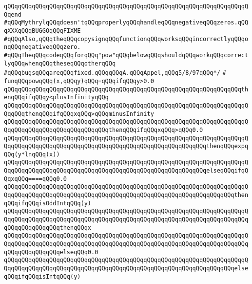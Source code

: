 \verb|qQQqqQQqqQQqqQQqqQQqqQQqqQQqqQQqqQQqqQQqqQQqqQQqqQQqqQQqqQQqqQQqqQQqqQQqend|\newline
\newline
\verb|#qQQqMythrylqQQqdoesn'tqQQqproperlyqQQqhandleqQQqnegativeqQQqzeros.qQQqXXXqQQqBUGGOqQQqFIXME|\newline
\verb|#qQQqAlso,qQQqtheqQQqcopysignqQQqfunctionqQQqworksqQQqincorrectlyqQQqonqQQqnegativeqQQqzero.|\newline
\verb|#qQQqTheqQQqcodeqQQqforqQQq"pow"qQQqbelowqQQqshouldqQQqworkqQQqcorrectlyqQQqwhenqQQqtheseqQQqotherqQQq|\newline
\verb|#qQQqbugsqQQqareqQQqfixed.qQQqqQQqA.qQQqAppel,qQQq5/8/97qQQq*/|\newline
\verb|#|\newline
\verb|funqQQqpowqQQq(x,qQQqy)qQQq=qQQqifqQQqy>0.0|\newline
\verb|qQQqqQQqqQQqqQQqqQQqqQQqqQQqqQQqqQQqqQQqqQQqqQQqqQQqqQQqqQQqqQQqqQQqthenqQQqifqQQqy<plusInfinityqQQq|\newline
\verb|qQQqqQQqqQQqqQQqqQQqqQQqqQQqqQQqqQQqqQQqqQQqqQQqqQQqqQQqqQQqqQQqqQQqqQQqqQQqthenqQQqifqQQqxqQQq>qQQqminusInfinity|\newline
\verb|qQQqqQQqqQQqqQQqqQQqqQQqqQQqqQQqqQQqqQQqqQQqqQQqqQQqqQQqqQQqqQQqqQQqqQQqqQQqqQQqqQQqqQQqqQQqqQQqqQQqthenqQQqifqQQqxqQQq>qQQq0.0|\newline
\verb|qQQqqQQqqQQqqQQqqQQqqQQqqQQqqQQqqQQqqQQqqQQqqQQqqQQqqQQqqQQqqQQqqQQqqQQqqQQqqQQqqQQqqQQqqQQqqQQqqQQqqQQqqQQqqQQqqQQqqQQqqQQqqQQqthenqQQqexpqQQq(y*lnqQQq(x))|\newline
\verb|qQQqqQQqqQQqqQQqqQQqqQQqqQQqqQQqqQQqqQQqqQQqqQQqqQQqqQQqqQQqqQQqqQQqqQQqqQQqqQQqqQQqqQQqqQQqqQQqqQQqqQQqqQQqqQQqqQQqqQQqqQQqqQQqelseqQQqifqQQqxqQQq====qQQq0.0|\newline
\verb|qQQqqQQqqQQqqQQqqQQqqQQqqQQqqQQqqQQqqQQqqQQqqQQqqQQqqQQqqQQqqQQqqQQqqQQqqQQqqQQqqQQqqQQqqQQqqQQqqQQqqQQqqQQqqQQqqQQqqQQqqQQqqQQqqQQqqQQqthenqQQqifqQQqisOddIntqQQq(y)|\newline
\verb|qQQqqQQqqQQqqQQqqQQqqQQqqQQqqQQqqQQqqQQqqQQqqQQqqQQqqQQqqQQqqQQqqQQqqQQqqQQqqQQqqQQqqQQqqQQqqQQqqQQqqQQqqQQqqQQqqQQqqQQqqQQqqQQqqQQqqQQqqQQqqQQqqQQqqQQqqQQqthenqQQqx|\newline
\verb|qQQqqQQqqQQqqQQqqQQqqQQqqQQqqQQqqQQqqQQqqQQqqQQqqQQqqQQqqQQqqQQqqQQqqQQqqQQqqQQqqQQqqQQqqQQqqQQqqQQqqQQqqQQqqQQqqQQqqQQqqQQqqQQqqQQqqQQqqQQqqQQqqQQqqQQqqQQqelseqQQq0.0|\newline
\verb|qQQqqQQqqQQqqQQqqQQqqQQqqQQqqQQqqQQqqQQqqQQqqQQqqQQqqQQqqQQqqQQqqQQqqQQqqQQqqQQqqQQqqQQqqQQqqQQqqQQqqQQqqQQqqQQqqQQqqQQqqQQqqQQqqQQqqQQqelseqQQqifqQQqisIntqQQq(y)|\newline
